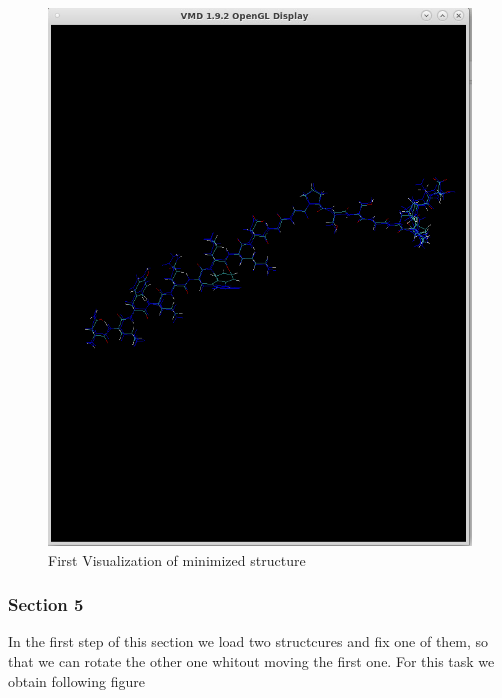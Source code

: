 \documentclass[11pt]{article}
\makeatletter
\def\maxwidth{\ifdim\Gin@nat@width>\linewidth\linewidth
    \else\Gin@nat@width\fi}
\let\Oldincludegraphics\includegraphics
\renewcommand{\includegraphics}[1]{\Oldincludegraphics[width=.8\maxwidth]{#1}}
\makeatother
\begin{document}
\begin{figure}
\centering
\includegraphics{Screenshot_fig_trp_min.png}
\caption{First Visualization of minimized structure}
\end{figure}

\subsubsection{Section 5}\label{section-5}

In the first step of this section we load two structcures and fix one of
them, so that we can rotate the other one whitout moving the first one.
For this task we obtain following figure
\end{document}
